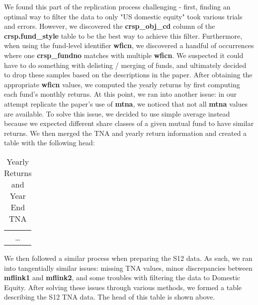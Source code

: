 \documentclass{article}
\begin{document}
We found this part of the replication process challenging - first, finding an optimal way to filter the data
to only "US domestic equity" took various trials and errors. However, we discovered the \textbf{crsp\_obj\_cd} column 
of the \textbf{crsp.fund\_style} table to be the best way to achieve this filter. Furthermore,
when using the fund-level identifier \textbf{wficn}, we discovered a handful of occurrences where 
one \textbf{crsp\_fundno} matches with multiple \textbf{wficn}. We suspected it could have to do 
something with delisting / merging of funds, and ultimately decided to drop these samples 
based on the descriptions in the paper. After obtaining the appropriate \textbf{wficn} values,
we computed the yearly returns by first computing each fund's
monthly returns. At this point, we 
ran into another issue: in our attempt replicate the paper's use of \textbf{mtna}, we noticed that
not all \textbf{mtna} values are available. To solve this issue, we decided to use simple
average instead because we expected different share classes of a given mutual fund to have similar
returns. We then merged the TNA and yearly return information and created a table with the following
head:  

\begin{table}[ht]

\centering
\captionsetup{labelformat=empty, font=bf}
\caption{Yearly Returns and Year End TNA}
\label{tab:table_crsp_clean}

\vspace{5pt} %

\begin{tabular}{c} %

\multicolumn{1}{c}{\ldots} \\ %
\end{tabular}
\end{table}


We then followed a similar process when preparing the S12 data. As such, we ran into
tangentially similar issues: missing TNA values, minor discrepancies between
\textbf{mflink1} and \textbf{mflink2}, and some troubles with filtering the data 
to Domestic Equity. After solving these issues through various methods, we formed a
table describing the S12 TNA data. The head of this table is shown above. 
\end{document}
